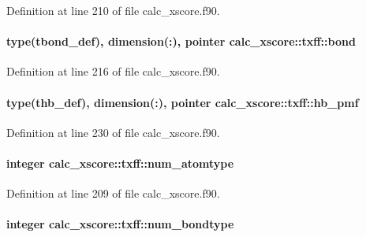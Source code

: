Definition at line 210 of file calc\-\_\-xscore.\-f90.

\hypertarget{structcalc__xscore_1_1txff_ad076e5d8a4c00d6feca1e704e0334cde}{
\paragraph[{bond}]{\setlength{\rightskip}{0pt plus 5cm}type({\bf tbond\-\_\-def}), dimension(\-:), pointer calc\-\_\-xscore\-::txff\-::bond}}\label{structcalc__xscore_1_1txff_ad076e5d8a4c00d6feca1e704e0334cde}


Definition at line 216 of file calc\-\_\-xscore.\-f90.

\hypertarget{structcalc__xscore_1_1txff_ac9365f9c3dc44037f16ed93129351c40}{
\paragraph[{hb\-\_\-pmf}]{\setlength{\rightskip}{0pt plus 5cm}type({\bf thb\-\_\-def}), dimension(\-:), pointer calc\-\_\-xscore\-::txff\-::hb\-\_\-pmf}}\label{structcalc__xscore_1_1txff_ac9365f9c3dc44037f16ed93129351c40}


Definition at line 230 of file calc\-\_\-xscore.\-f90.

\hypertarget{structcalc__xscore_1_1txff_a3054dd3813b39fd6de0db5e461dcc2f8}{
\paragraph[{num\-\_\-atomtype}]{\setlength{\rightskip}{0pt plus 5cm}integer calc\-\_\-xscore\-::txff\-::num\-\_\-atomtype}}\label{structcalc__xscore_1_1txff_a3054dd3813b39fd6de0db5e461dcc2f8}


Definition at line 209 of file calc\-\_\-xscore.\-f90.

\hypertarget{structcalc__xscore_1_1txff_a8bbaa5e773076359286cb4e1d75605ab}{
\paragraph[{num\-\_\-bondtype}]{\setlength{\rightskip}{0pt plus 5cm}integer calc\-\_\-xscore\-::txff\-::num\-\_\-bondtype}}\label{structcalc__xscore_1_1txff_a8bbaa5e773076359286cb4e1d75605ab}


